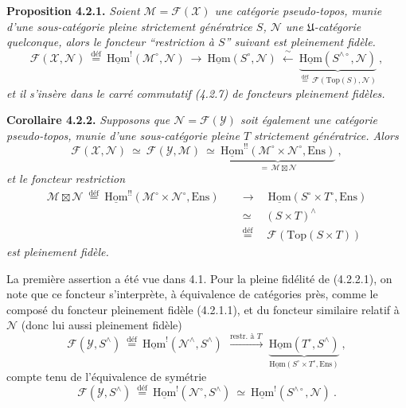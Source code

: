 \documentclass[11pt]{article}
\newcommand{\msp}[1]{\marginpar{\footnotesize [#1]}}
\newcommand{\cM}{\mathcal{M}}
\newcommand{\cN}{\mathcal{N}}
\newcommand{\cX}{\mathcal{X}}
\newcommand{\cY}{\mathcal{Y}}
\newcommand{\cF}{\mathcal{F}}
\newcommand{\uHom}{\underline{\mathrm{Hom}}}
\newcommand{\Ens}{\mathrm{Ens}}
\newcommand{\Top}{\mathrm{Top}}
\newcommand{\defeq}{\overset{\text{déf}}{=}}
\newcommand{\bt}{\boxtimes}
\begin{document}
\textbf{Proposition 4.2.1.} \textit{Soient $\cM=\cF(\cX)$ une catégorie pseudo-topos, munie d'une sous-catégorie pleine strictement génératrice $S$, $\cN$ une $\mathfrak{U}$-catégorie quelconque, alors le foncteur “restriction à $S$” suivant est pleinement fidèle.}
\[
\cF(\cX,\cN) \ \defeq\ \uHom^{!}(\cM^{\circ},\cN) \ \longrightarrow\ \uHom(S^{\circ},\cN) \ \xleftarrow{\ \sim\ }\ \underbrace{\uHom(S^{\wedge\circ},\cN)}_{\defeq\, \cF(\Top(S),\cN)} \ ,
\tag*{(4.2.1.1)}
\]
\textit{et il s'insère dans le carré commutatif (4.2.7) de foncteurs pleinement fidèles.}

\textbf{Corollaire 4.2.2.} \textit{Supposons que $\cN=\cF(\cY)$ soit également une catégorie pseudo-topos, munie d'une sous-catégorie pleine $T$ strictement génératrice. Alors}
\[
\cF(\cX,\cN) \ \simeq\ \cF(\cY,\cM) \ \simeq\ \underbrace{\uHom^{!!}(\cM^{\circ}\times\cN^{\circ},\Ens)}_{=\,\cM\bt\cN} \ ,
\]
\textit{et le foncteur restriction}
\[
\begin{aligned}
\cM\bt\cN \ \defeq\ \uHom^{!!}(\cM^{\circ}\times\cN^{\circ},\Ens) \quad &\longrightarrow \quad \uHom(S^{\circ}\times T^{\circ},\Ens)\\
&\simeq \quad (S\times T)^{\wedge}\\
&\defeq \quad \cF(\Top(S\times T))
\end{aligned}
\tag*{(4.2.2.1)}
\]
\textit{est pleinement fidèle.}

La première assertion a été vue dans 4.1. Pour la pleine fidélité de (4.2.2.1), on note que ce foncteur s'interprète, à équivalence de catégories près, comme le composé du foncteur pleinement fidèle (4.2.1.1), et du foncteur
\msp{page 62}
similaire relatif à $\cN$ (donc lui aussi pleinement fidèle)
\[
\cF(\cY,S^{\wedge}) \ \defeq\ \uHom^{!}(\cN^{\wedge},S^{\wedge}) \ \xrightarrow{\ \text{restr. à } T\ }\ \underbrace{\uHom(T^{\circ},S^{\wedge})}_{\uHom(S^{\circ}\times T^{\circ},\Ens)} \ ,
\tag*{(4.2.2.2)} %
\]
compte tenu de l'équivalence de symétrie
\[
\cF(\cY,S^{\wedge}) \ \defeq\ \uHom^{!}(\cN^{\circ},S^{\wedge}) \ \simeq\ \uHom^{!}(S^{\wedge\circ},\cN) \ .
\tag*{(4.2.2.3)}
\]
\end{document}
